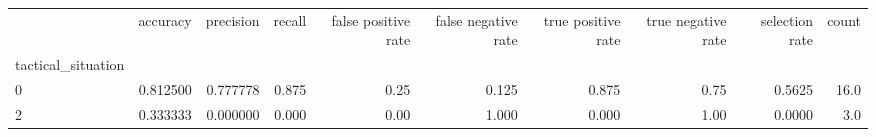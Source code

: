 \begin{tabular}{lrrrrrrrrr}
\toprule
{} &  accuracy &  precision &  recall &  false positive rate &  false negative rate &  true positive rate &  true negative rate &  selection rate &  count \\
tactical\_situation &           &            &         &                      &                      &                     &                     &                 &        \\
\midrule
0                  &  0.812500 &   0.777778 &   0.875 &                 0.25 &                0.125 &               0.875 &                0.75 &          0.5625 &   16.0 \\
2                  &  0.333333 &   0.000000 &   0.000 &                 0.00 &                1.000 &               0.000 &                1.00 &          0.0000 &    3.0 \\
\bottomrule
\end{tabular}
